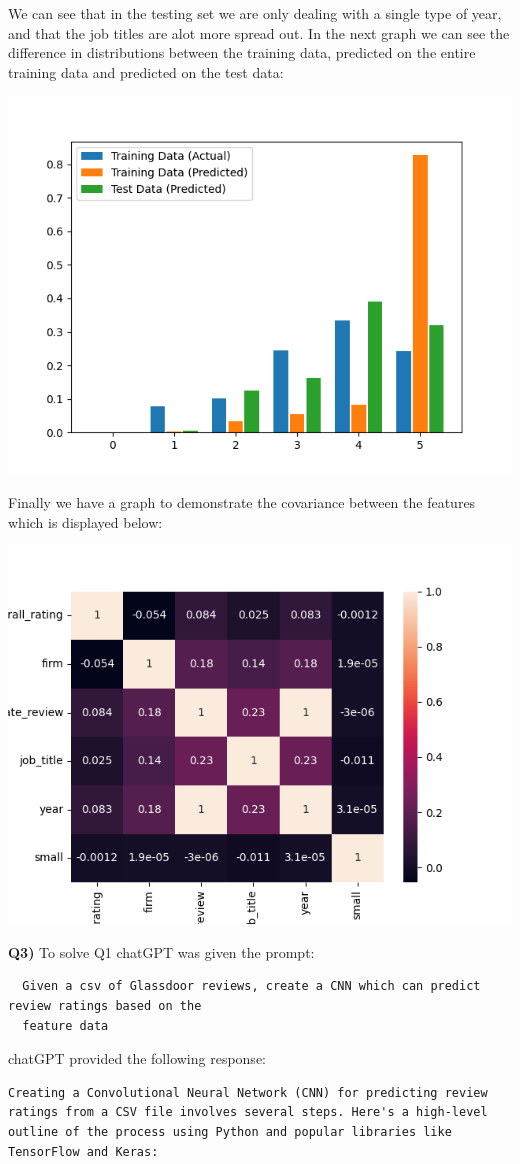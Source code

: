 \documentclass{article}
\begin{document}
\begin{titlepage}
We can see that in the testing set we are only dealing with a single type of year, and that the job titles are alot more spread out. In the next graph we can see the difference in distributions between the training data, predicted on the entire training data and predicted on the test data:
\begin{center}
\includegraphics[width=.7\linewidth]{graph.png}
\end{center}
Finally we have a graph to demonstrate the covariance between the features which is displayed below:
\begin{center}
\includegraphics[width=.7\linewidth]{corr.png}
\end{center}
\newpage
\textbf{Q3)} To solve Q1 chatGPT was given the prompt: 
\begin{verbatim}
  Given a csv of Glassdoor reviews, create a CNN which can predict review ratings based on the 
  feature data
\end{verbatim}
chatGPT provided the following response:
\begin{verbatim}
Creating a Convolutional Neural Network (CNN) for predicting review ratings from a CSV file involves several steps. Here's a high-level outline of the process using Python and popular libraries like TensorFlow and Keras:


\end{verbatim}
\end{titlepage}
\end{document}
